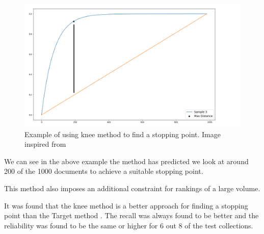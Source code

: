 \begin{figure}[H]
\center
\includegraphics[width=13cm]{figures/knee.png}
\caption{Example of using knee method to find a stopping point. Image inspired from \cite{Satopa11}}
\end{figure}

We can see in the above example the method has predicted we look at around 200 of the 1000 documents to achieve a suitable stopping point.

This method also imposes an additional constraint for rankings of a large volume. 

It was found that the knee method is a better approach for finding a stopping point than the Target method \cite{Cormack2016}. The recall was always found to be better and the reliability was found to be the same or higher for 6 out 8 of the test collections.




